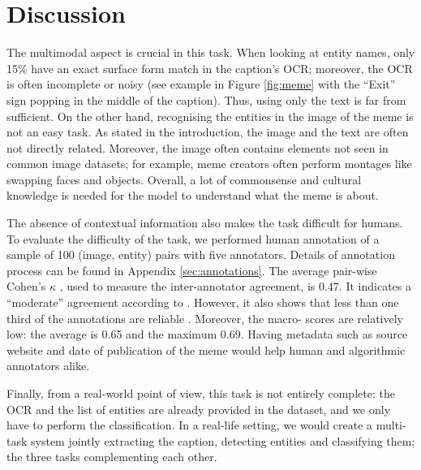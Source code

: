 \section{Discussion}
\label{sec:discussion}
The multimodal aspect is crucial in this task. When looking at entity names, only 15\% have an exact surface form match in the caption's OCR; moreover, the OCR is often incomplete or noisy (see example in Figure \ref{fig:meme} with the ``Exit'' sign popping in the middle of the caption).
Thus, using only the text is far from sufficient. On the other hand, recognising the entities in the image of the meme is not an easy task.
As stated in the introduction, the image and the text are often not directly related. Moreover, the image often contains elements not seen in common image datasets; for example, meme creators often perform montages like swapping faces and objects.
Overall, a lot of commonsense and cultural knowledge is needed for the model to understand what the meme is about. 

The absence of contextual information also makes the task difficult for humans. 
To evaluate the difficulty of the task, we performed human annotation of a sample of 100 (image, entity) pairs with five annotators. Details of annotation process can be found in Appendix \ref{sec:annotations}. The average pair-wise Cohen's $\kappa$ \cite{cohenkappa}, used to measure the inter-annotator agreement, is 0.47. It indicates a ``moderate'' agreement according to \citet{cohenkappa}. However, it also shows that less than one third of the annotations are reliable \cite{mchugh2012interrater}. Moreover, the macro-\fone{} scores are relatively low: the average is 0.65 and the maximum 0.69. 
Having metadata such as source website and date of publication of the meme would help human and algorithmic annotators alike.

Finally, from a real-world point of view, this task is not entirely complete: the OCR and the list of entities are already provided in the dataset, and we only have to perform the classification. In a real-life setting, we would create a multi-task system jointly extracting the caption, detecting entities and classifying them; the three tasks complementing each other.







